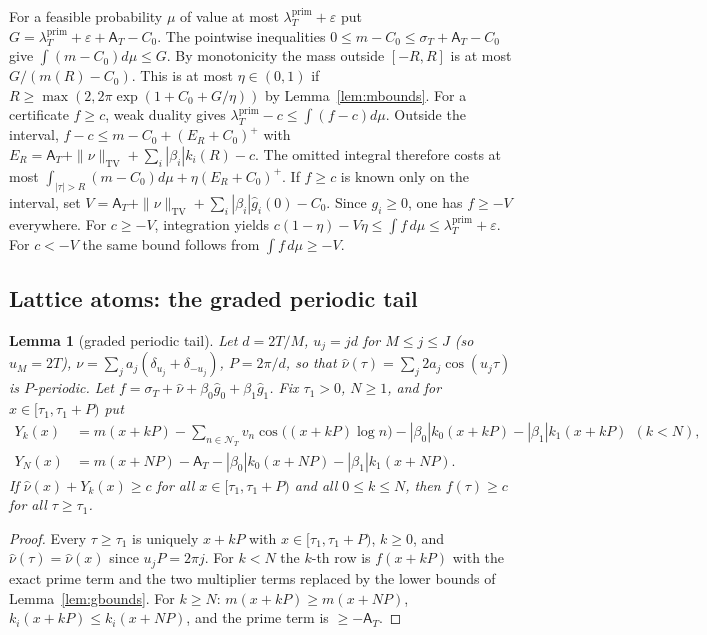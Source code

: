 \documentclass[10pt]{amsart}
\newtheorem{lemma}[theorem]{Lemma}
\theoremstyle{definition}
\theoremstyle{remark}
\newcommand{\TV}{\operatorname{TV}}
\newcommand{\lamP}{\lambda^{\mathrm{prim}}_T}
\newcommand{\sT}{\sigma_T}
\newcommand{\gh}[1]{\widehat g_{#1}}
\newcommand{\nuh}{\widehat\nu}
\newcommand{\NT}{\mathcal N_T}
\newcommand{\Aconst}{\mathsf A_T}
\begin{document}
For a feasible probability $\mu$ of value at most $\lamP+\varepsilon$
put $G=\lamP+\varepsilon+\Aconst-C_0$. The pointwise inequalities
$0\le m-C_0\le\sT+\Aconst-C_0$ give
$\int(m-C_0)d\mu\le G$. By monotonicity the mass outside $[-R,R]$
is at most $G/(m(R)-C_0)$. This is at most $\eta\in(0,1)$ if
$R\ge\max(2,2\pi\exp(1+C_0+G/\eta))$ by Lemma~\ref{lem:mbounds}.
For a certificate $f\ge c$, weak duality gives
$\lamP-c\le\int(f-c)d\mu$. Outside the interval,
$f-c\le m-C_0+(E_R+C_0)^+$ with
$E_R=\Aconst+\|\nu\|_{\TV}+\sum_i|\beta_i|k_i(R)-c$.
The omitted integral therefore costs at most
$\int_{|\tau|>R}(m-C_0)d\mu+\eta(E_R+C_0)^+$.
If $f\ge c$ is known only on the interval, set
$V=\Aconst+\|\nu\|_{\TV}+\sum_i|\beta_i|\widehat g_i(0)-C_0$.
Since $g_i\ge0$, one has $f\ge-V$ everywhere. For $c\ge-V$,
integration yields $c(1-\eta)-V\eta\le\int f\,d\mu\le\lamP+\varepsilon$.
For $c<-V$ the same bound follows from $\int f\,d\mu\ge-V$.

\subsection{Lattice atoms: the graded periodic tail}

\begin{lemma}[graded periodic tail]\label{lem:F1}
Let $d=2T/M$, $u_j=jd$ for $M\le j\le J$ (so $u_M=2T$), $\nu=\sum_ja_j(\delta_{u_j}+\delta_{-u_j})$,
$P=2\pi/d$, so that $\nuh(\tau)=\sum_j2a_j\cos(u_j\tau)$ is $P$-periodic. Let
$f=\sT+\nuh+\beta_0\gh0+\beta_1\gh1$. Fix $\tau_1>0$, $N\ge1$, and for $x\in[\tau_1,\tau_1+P)$ put
\begin{align*}
Y_k(x)&=m(x+kP)-\sum_{n\in\NT}v_n\cos\big((x+kP)\log n\big)-|\beta_0|k_0(x+kP)-|\beta_1|k_1(x+kP)\ \ (k<N),\\
Y_N(x)&=m(x+NP)-\Aconst-|\beta_0|k_0(x+NP)-|\beta_1|k_1(x+NP).
\end{align*}
If $\nuh(x)+Y_k(x)\ge c$ for all $x\in[\tau_1,\tau_1+P)$ and all $0\le k\le N$, then $f(\tau)\ge c$
for all $\tau\ge\tau_1$.
\end{lemma}
\begin{proof}
Every $\tau\ge\tau_1$ is uniquely $x+kP$ with $x\in[\tau_1,\tau_1+P)$, $k\ge0$, and
$\nuh(\tau)=\nuh(x)$ since $u_jP=2\pi j$. For $k<N$ the $k$-th row is $f(x+kP)$ with the exact
prime term and the two multiplier terms replaced by the lower bounds of Lemma~\ref{lem:gbounds}.
For $k\ge N$: $m(x+kP)\ge m(x+NP)$, $k_i(x+kP)\le k_i(x+NP)$, and the prime term is $\ge-\Aconst$.
\end{proof}
\end{document}
